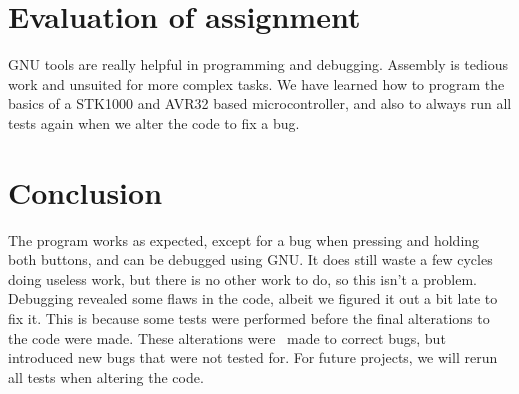 \section{Evaluation of assignment}


GNU tools are really helpful in programming and debugging. Assembly is tedious work and unsuited for more complex tasks. We have learned how to program the basics of a STK1000 and AVR32 based microcontroller, and also to always run all tests again when we alter the code to fix a bug.


\section{Conclusion}

The program works as expected, except for a bug when pressing and holding both buttons, and can be debugged using GNU. It does still waste a few cycles doing useless work, but there is no other work to do, so this isn’t a problem. Debugging revealed some flaws in the code, albeit we figured it out a bit late to fix it. This is because some tests were performed before the final alterations to the code were made. These alterations were  made to correct bugs, but introduced new bugs that were not tested for. For future projects, we will rerun all tests when altering the code.
